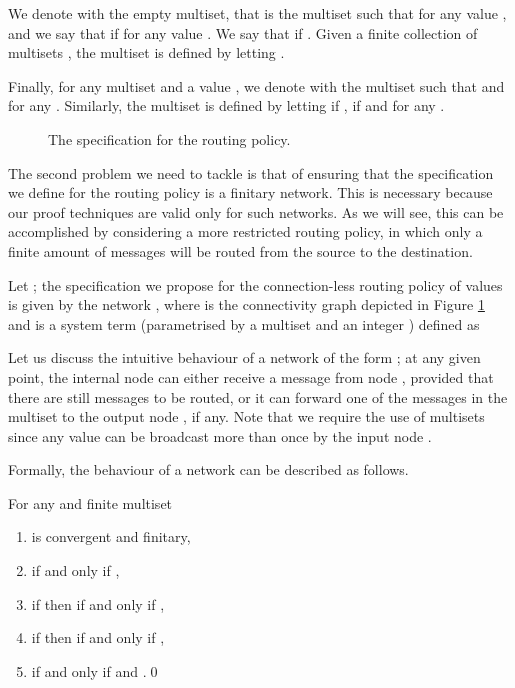 \documentclass{LMCS}
\begin{document}
We denote with  the empty multiset, 
that is the multiset such that  
for any value , and we say that 
 if  for any value . 
We say that  if . 
Given a finite collection of multisets , the multiset  
is defined by letting . 

Finally, for any multiset  and a value , we denote 
with  the multiset such that 
 and 
 for any 
. Similarly, the multiset  
is defined by letting  if , 
 if  
and  for any 
.

\begin{figure}
\caption{The specification  for the routing policy.}
\label{fig:routing.model}
\end{figure}

The second problem we need to tackle is that of ensuring 
that the specification we define for the routing policy 
is a finitary network. 
This is necessary because our proof techniques 
are valid only for such networks. As we will see, 
this can be accomplished by considering a more restricted 
routing policy, in which only a finite amount of messages 
will be routed from the source to the destination.

Let ; the specification we propose for the connection-less 
routing policy of  values is given by the network 
, where 
 is the connectivity graph depicted 
in Figure \ref{fig:routing.model}
and  is a system term (parametrised 
by a multiset  and an integer ) 
defined as 
\smallskip

\noindent Let us discuss the intuitive behaviour of a network of the form 
; at any given point, the internal node 
 can either receive a message from node , provided that 
there are still messages to be routed, or it can forward 
one of the messages in the multiset  to the 
output node , if any. Note that we require the use 
of multisets since any value  
can be broadcast more than once by the input node .

Formally, the behaviour of a network  
can be described as follows. 
\begin{prop}
\label{prop:routing.model.transitions}
For any  and finite multiset  
\begin{enumerate}
\item  is convergent and finitary,
\item  if and 
only if ,
\item if  then  
 if and only 
if , 
\item if  then  if and only if , 
\item  if 
and only if  and .\qed
\end{enumerate}
\end{prop}
\end{document}
